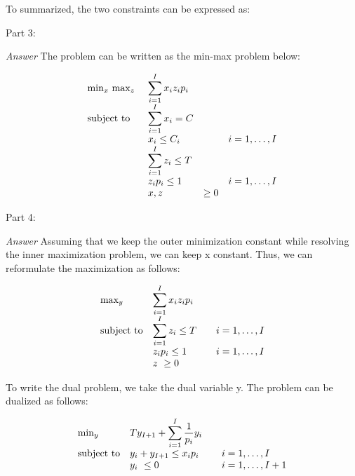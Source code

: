\documentclass[10pt]{article}
\newenvironment{exercise}[2][Exercise]{\begin{trivlist}
  \item[\hskip \labelsep {\bfseries #1}\hskip \labelsep {\bfseries #2.}]}{\end{trivlist}}
\begin{document}
\begin{exercise}{5}
To summarized, the two constraints can be expressed as:


Part 3:

\textit{Answer}
The problem can be written as the min-max problem below:

\begin{equation}
\begin{array}{ll@{}lll}
\text{min}_x\ \text{max}_z\ && \displaystyle\sum\limits_{i=1}^{I} x_i z_i p_i\\

\text{subject to} 
&& \displaystyle\sum\limits_{i=1}^{I} x_i = C\\
&& x_i \leq C_i && i=1 ,\dots, I\\
&& \displaystyle\sum\limits_{i=1}^{I} z_i \leq T \\
                && z_i p_i \leq 1  &&  i=1 ,\dots, I\\
                && x,z &\geq 0\\ 



\end{array}
\end{equation}


Part 4:

\textit{Answer}
Assuming that we keep the outer minimization constant while resolving the inner maximization problem, we can keep x constant. Thus, we can reformulate the maximization as follows:

\begin{equation}
\begin{array}{ll@{}lll}
\text{max}_y\ && \displaystyle\sum\limits_{i=1}^{I} x_i z_i p_i\\

\text{subject to} 
&& \displaystyle\sum\limits_{i=1}^{I} z_i \leq T &&  i=1 ,\dots, I \\
                && z_i p_i \leq 1  &&  i=1 ,\dots, I\\
                && z\ \geq 0\\ 

\end{array}
\end{equation}

To write the dual problem, we take the dual variable y. The problem can be dualized as follows:

\begin{equation}
\begin{array}{ll@{}lll}
\text{min}_y\ &&Ty_{I+1} + \displaystyle\sum\limits_{i=1}^{I} \frac{1}{p_i} y_i\\

\text{subject to} 
&& y_i + y_{I+1} \leq x_i p_i  &&  i=1 ,\dots, I\\
&& y_i\ \leq 0 && i=1 ,\dots, I+1\\ 

\end{array}
\end{equation}

\end{exercise}
\end{document}
